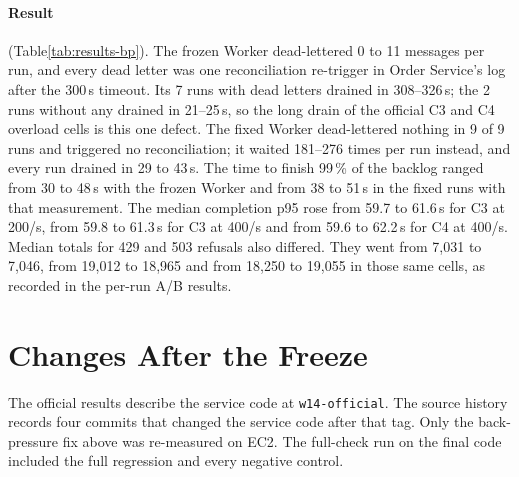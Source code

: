 \documentclass[a4paper]{report}
\begin{document}
\paragraph{Result} (Table\nobreakspace\ref{tab:results-bp}). The frozen Worker
dead-lettered 0 to 11 messages per run, and every dead letter was one
reconciliation re-trigger in Order Service's log after the 300\,s timeout. Its 7
runs with dead letters drained in 308--326\,s; the 2 runs without any drained in
21--25\,s, so the long drain of the official C3 and C4 overload cells is this one
defect. The fixed Worker dead-lettered nothing in 9 of 9 runs and triggered no
reconciliation; it waited 181--276 times per run instead, and every run drained
in 29 to 43\,s. The time to finish 99\,\% of the backlog ranged from 30 to
48\,s with the frozen Worker and from 38 to 51\,s in the fixed runs with
that measurement. The median completion p95 rose from 59.7 to 61.6\,s
for C3 at 200/s, from 59.8 to 61.3\,s for C3 at 400/s and from 59.6
to 62.2\,s for C4 at 400/s. Median totals for 429 and 503 refusals
also differed. They went from 7,031 to 7,046, from 19,012 to 18,965
and from 18,250 to 19,055 in those same cells, as recorded in the per-run
A/B results.

\begin{table}[H]
\centering
\footnotesize
\setlength{\tabcolsep}{3pt}
\caption{Process Worker back-pressure fix, frozen against fixed Worker on one
host pair after the freeze. The official tables exclude these runs.
Dead-lettered and back-pressure waits are the Worker's counters over the run.
Reconciliation counts the re-triggers Order Service logged; in every run it equals
the Worker's dead letters. The frozen Worker exports no back-pressure counter. A
fast drain can end before the collector's sample that shows 99\,\% done; the
number of runs measured is then given. Cells: median of 3 runs (range).}
\label{tab:results-bp}
\end{table}

\section{Changes After the Freeze}
\label{sec:post-freeze-changes}

The official results describe the service code at \texttt{w14-official}. The
source history records four commits that changed the service code after that
tag.
Only the back-pressure fix above was re-measured on EC2. The full-check run
on the final code included the full regression and every negative control.
\end{document}
